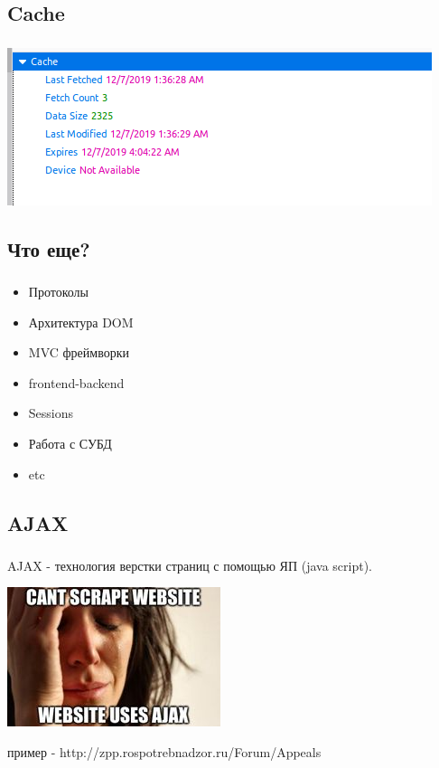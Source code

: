 \documentclass[t, 11pt]{beamer}
\begin{document}
\subsection{Cache}

\begin{frame}
	\frametitle{\insertsection}
	\frametitle{\insertsubsection}  
	\includegraphics[width=0.8\linewidth]{cach.png}
\end{frame}


\subsection{Что еще?}

\begin{frame}
	\frametitle{\insertsection}
	\frametitle{\insertsubsection}  
	\begin{itemize}
	\item Протоколы 
	\item Архитектура DOM
	\item MVC фреймворки 
	\item frontend-backend 
	\item Sessions 	
	\item Работа с СУБД 
	\item etc
\end{itemize}
\end{frame}


\subsection{AJAX}

\begin{frame}
	\frametitle{\insertsection}
	\frametitle{\insertsubsection}  
	AJAX - технология верстки страниц с помощью ЯП (java script).
	
	\vspace{0.5cm}
	
	\includegraphics[width=0.5\linewidth]{ajax_mem.jpg}
	
	пример - http://zpp.rospotrebnadzor.ru/Forum/Appeals
\end{frame}
\end{document}
